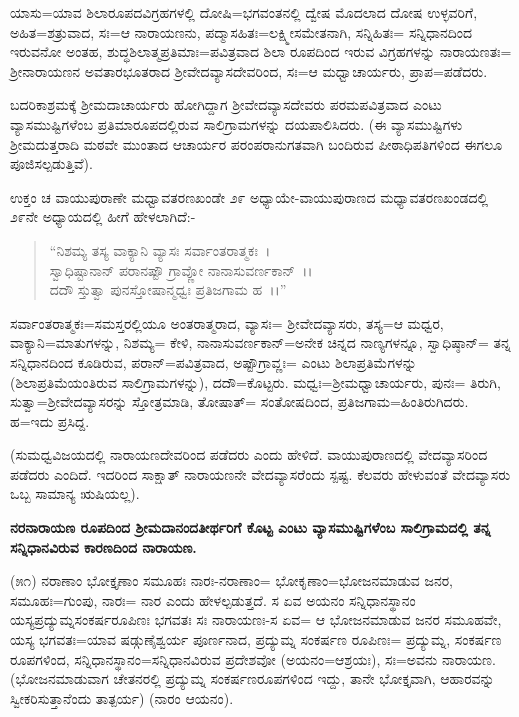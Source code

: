 ಯಾಸು=ಯಾವ ಶಿಲಾರೂಪದವಿಗ್ರಹಗಳಲ್ಲಿ ದೋಷಿ=ಭಗವಂತನಲ್ಲಿ ದ್ವೇಷ ಮೊದಲಾದ ದೋಷ ಉಳ್ಳವರಿಗೆ, ಅಹಿತ=ಶತ್ರುವಾದ, ಸಃ=ಆ ನಾರಾಯಣನು, ಪದ್ಮಾಸಹಿತಃ=ಲಕ್ಷ್ಮೀಸಮೇತನಾಗಿ, ಸನ್ನಿಹಿತಃ= ಸನ್ನಿಧಾನದಿಂದ ಇರುವನೋ ಅಂತಹ, ಶುದ್ಧಶಿಲಾತ್ಮಪ್ರತಿಮಾಃ=ಪವಿತ್ರವಾದ ಶಿಲಾ ರೂಪದಿಂದ ಇರುವ ವಿಗ್ರಹಗಳನ್ನು ನಾರಾಯಣತಃ= ಶ‍್ರೀನಾರಾಯಣನ ಅವತಾರಭೂತರಾದ ಶ‍್ರೀವೇದವ್ಯಾಸದೇವರಿಂದ, ಸಃ=ಆ ಮಧ್ವಾಚಾರ್ಯರು, ಪ್ರಾಪ=ಪಡೆದರು.

ಬದರಿಕಾಶ್ರಮಕ್ಕೆ ಶ‍್ರೀಮದಾಚಾರ್ಯರು ಹೋಗಿದ್ದಾಗ ಶ‍್ರೀವೇದವ್ಯಾಸದೇವರು ಪರಮಪವಿತ್ರವಾದ ಎಂಟು ವ್ಯಾಸಮುಷ್ಟಿಗಳೆಂಬ ಪ್ರತಿಮಾರೂಪದಲ್ಲಿರುವ ಸಾಲಿಗ್ರಾಮಗಳನ್ನು ದಯಪಾಲಿಸಿದರು. (ಈ ವ್ಯಾಸಮುಷ್ಟಿಗಳು ಶ‍್ರೀಮದುತ್ತರಾದಿ ಮಠವೇ ಮುಂತಾದ ಆಚಾರ್ಯರ ಪರಂಪರಾನುಗತವಾಗಿ ಬಂದಿರುವ ಪೀಠಾಧಿಪತಿಗಳಿಂದ ಈಗಲೂ ಪೂಜಿಸಲ್ಪಡುತ್ತಿವೆ).

ಉಕ್ತಂ ಚ ವಾಯುಪುರಾಣೇ ಮಧ್ವಾವತರಣಖಂಡೇ ೨೯ ಅಧ್ಯಾಯೇ-ವಾಯುಪುರಾಣದ ಮಧ್ಯಾವತರಣಖಂಡದಲ್ಲಿ ೨೯ನೇ ಅಧ್ಯಾಯದಲ್ಲಿ ಹೀಗೆ ಹೇಳಲಾಗಿದೆ:-

\begin{verse}
``ನಿಶಮ್ಯ ತಸ್ಯ ವಾಕ್ಯಾನಿ ವ್ಯಾಸಃ ಸರ್ವಾಂತರಾತ್ಮಕಃ~।\\ ಸ್ವಾಧಿಷ್ಟಾನಾನ್ ಪರಾನಷ್ಟೌ ಗ್ರಾವ್ಣೋ ನಾನಾಸುವರ್ಣಕಾನ್~।।\\ ದದೌ ಸ್ತುತ್ವಾ ಪುನಸ್ತೋಷಾನ್ಮಧ್ವಃ ಪ್ರತಿಜಗಾಮ ಹ~।।”
\end{verse}

ಸರ್ವಾಂತರಾತ್ಮಕಃ=ಸಮಸ್ತರಲ್ಲಿಯೂ ಅಂತರಾತ್ಮರಾದ, ವ್ಯಾಸಃ= ಶ‍್ರೀವೇದವ್ಯಾಸರು, ತಸ್ಯ=ಆ ಮಧ್ವರ, ವಾಕ್ಯಾನಿ=ಮಾತುಗಳನ್ನು, ನಿಶಮ್ಯ= ಕೇಳಿ, ನಾನಾಸುವರ್ಣಕಾನ್=ಅನೇಕ ಚಿನ್ನದ ನಾಣ್ಯಗಳನ್ನೂ, ಸ್ವಾಧಿಷ್ಠಾನ್= ತನ್ನ ಸನ್ನಿಧಾನದಿಂದ ಕೂಡಿರುವ, ಪರಾನ್=ಪವಿತ್ರವಾದ, ಅಷ್ಟೌಗ್ರಾವ್ಣಃ= ಎಂಟು ಶಿಲಾಪ್ರತಿಮೆಗಳನ್ನು (ಶಿಲಾಪ್ರತಿಮೆಯಂತಿರುವ ಸಾಲಿಗ್ರಾಮಗಳನ್ನು), ದದೌ=ಕೊಟ್ಟರು. ಮಧ್ವಃ=ಶ‍್ರೀಮಧ್ವಾಚಾರ್ಯರು, ಪುನಃ= ತಿರುಗಿ, ಸುತ್ವಾ=ಶ‍್ರೀವೇದವ್ಯಾಸರನ್ನು ಸ್ತೋತ್ರಮಾಡಿ, ತೋಷಾತ್= ಸಂತೋಷದಿಂದ, ಪ್ರತಿಜಗಾಮ=ಹಿಂತಿರುಗಿದರು. ಹ=ಇದು ಪ್ರಸಿದ್ದ.

(ಸುಮಧ್ವವಿಜಯದಲ್ಲಿ ನಾರಾಯಣದೇವರಿಂದ ಪಡೆದರು ಎಂದು ಹೇಳಿದೆ. ವಾಯುಪುರಾಣದಲ್ಲಿ ವೇದವ್ಯಾಸರಿಂದ ಪಡೆದರು ಎಂದಿದೆ. ಇದರಿಂದ ಸಾಕ್ಷಾತ್ ನಾರಾಯಣನೇ ವೇದವ್ಯಾಸರೆಂದು ಸ್ಪಷ್ಟ. ಕೆಲವರು ಹೇಳುವಂತೆ ವೇದವ್ಯಾಸರು ಒಬ್ಬ ಸಾಮಾನ್ಯ ಋಷಿಯಲ್ಲ).

\begin{center}
\textbf{ನರನಾರಾಯಣ ರೂಪದಿಂದ ಶ‍್ರೀಮದಾನಂದತೀರ್ಥರಿಗೆ ಕೊಟ್ಟ ಎಂಟು ವ್ಯಾಸಮುಷ್ಟಿಗಳೆಂಬ ಸಾಲಿಗ್ರಾಮದಲ್ಲಿ ತನ್ನ ಸನ್ನಿಧಾನವಿರುವ ಕಾರಣದಿಂದ ನಾರಾಯಣ.}
\end{center}

(೫೧) ನರಾಣಾಂ ಭೋಕ್ತೃಣಾಂ ಸಮೂಹಃ ನಾರಃ-ನರಾಣಾಂ= ಭೋಕೃಣಾಂ=ಭೋಜನಮಾಡುವ ಜನರ, ಸಮೂಹಃ=ಗುಂಪು, ನಾರಃ= ನಾರ ಎಂದು ಹೇಳಲ್ಪಡುತ್ತದೆ. ಸ ಏವ ಅಯನಂ ಸನ್ನಿಧಾನಸ್ಥಾನಂ ಯಸ್ಯಪ್ರದ್ಯುಮ್ನಸಂಕರ್ಷರೂಪಿಣಃ ಭಗವತಃ ಸಃ ನಾರಾಯಣಃ-ಸ ಏವ= ಆ ಭೋಜನಮಾಡುವ ಜನರ ಸಮೂಹವೇ, ಯಸ್ಯ ಭಗವತಃ=ಯಾವ ಷಡ್ಗುಣೈಶ್ವರ್ಯ ಪೂರ್ಣನಾದ, ಪ್ರದ್ಯುಮ್ನ ಸಂಕರ್ಷಣ ರೂಪಿಣಃ= ಪ್ರದ್ಯುಮ್ನ, ಸಂಕರ್ಷಣ ರೂಪಗಳಿಂದ, ಸನ್ನಿಧಾನಸ್ಥಾನಂ=ಸನ್ನಿಧಾನವಿರುವ ಪ್ರದೇಶವೋ (ಅಯನಂ=ಆಶ್ರಯಃ), ಸಃ=ಅವನು ನಾರಾಯಣ. (ಭೋಜನಮಾಡುವಾಗ ಚೇತನರಲ್ಲಿ ಪ್ರದ್ಯುಮ್ನ ಸಂಕರ್ಷಣರೂಪಗಳಿಂದ ಇದ್ದು, ತಾನೇ ಭೋಕ್ತೃವಾಗಿ, ಆಹಾರವನ್ನು ಸ್ವೀಕರಿಸುತ್ತಾನೆಂದು ತಾತ್ಪರ್ಯ) (ನಾರಂ ಆಯನಂ).


